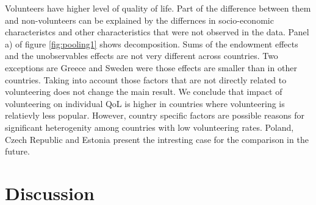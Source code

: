 \documentclass[10pt, letterpaper]{article}
\begin{document}
\begin{spacing}{1.4}
\begin{figure}[H]
\begin{minipage}{1\linewidth}
\end{minipage}
\end{figure}
 
Volunteers have higher level of quality of life. Part of the difference between them and non-volunteers can be explained by the differnces in socio-economic characteristcs and other characteristics that were not observed in the data. Panel a) of figure \ref{fig:pooling1} shows decomposition. Sums of the endowment effects and the unobservables effects are not very different across countries. Two exceptions are Greece and Sweden were those effects are smaller than in other countries. Taking into account those factors that are not directly related to volunteering does not change the main result. We conclude that impact of volunteering on individual QoL is higher in countries where volunteering is relatievly less popular. However, country specific factors are possible reasons for significant heterogenity among countries with low volunteering rates. Poland, Czech Republic and Estonia present the intresting case for the comparison in the future.   
 
\section{Discussion}


\end{spacing}
\end{document}
